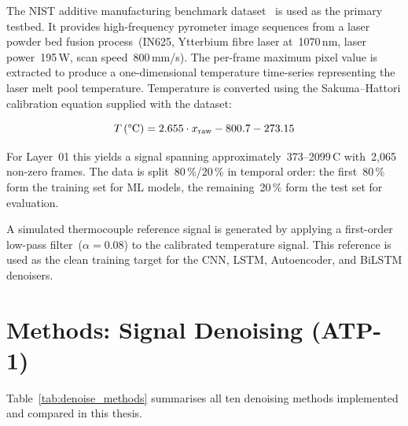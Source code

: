 The NIST additive manufacturing benchmark dataset~\cite{nist_dataset} is used as the primary testbed. It provides high-frequency pyrometer image sequences from a laser powder bed fusion process~(IN625, Ytterbium fibre laser at~1070\,nm, laser power~195\,W, scan speed~800\,mm/s). The per-frame maximum pixel value is extracted to produce a one-dimensional temperature time-series representing the laser melt pool temperature. Temperature is converted using the Sakuma--Hattori calibration equation supplied with the dataset:

\begin{equation}
T\,(\text{\textdegree C}) = 2.655 \cdot x_{\text{raw}} - 800.7 - 273.15
\label{eq:sakuma}
\end{equation}

For Layer~01 this yields a signal spanning approximately~373--2099\,\textdegree C with~2,065 non-zero frames. The data is split~80\,\%/20\,\% in temporal order: the first~80\,\% form the training set for ML models, the remaining~20\,\% form the test set for evaluation.

A simulated thermocouple reference signal is generated by applying a first-order low-pass filter~($\alpha = 0.08$) to the calibrated temperature signal. This reference is used as the clean training target for the CNN, LSTM, Autoencoder, and BiLSTM denoisers.

\section{Methods: Signal Denoising (ATP-1)}
\label{sec:method_denoise}

Table~\ref{tab:denoise_methods} summarises all ten denoising methods implemented and compared in this thesis.

